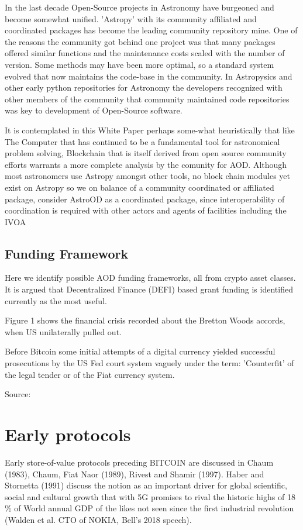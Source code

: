 \documentclass[final,5p,times,twocolumn,authoryear]{elsarticle}
\begin{document}
In the last decade Open-Source projects in Astronomy have burgeoned and become somewhat unified. 'Astropy' with its community affiliated and coordinated packages has become the leading community repository mine.  One of the reasons the community got behind one project was that many packages offered similar functions and the maintenance costs scaled with the number of version. Some methods may have been more optimal, so a standard system evolved that now maintains the code-base in the community. In Astropysics and other early python repositories for Astronomy the developers recognized with other members of the community that community maintained code repositories was key to development of Open-Source software.

It is contemplated in this White Paper perhaps some-what heuristically that like The Computer that has continued to be a fundamental tool for astronomical problem solving, Blockchain that is itself derived from open source community efforts warrants a more complete analysis by the comunity for AOD. Although most astronomers use Astropy amongst other tools, no block chain modules yet exist on Astropy so we on balance of a community coordinated or affiliated package, consider AstroOD as a coordinated package, since interoperability of coordination is required with other actors and agents of facilities including the IVOA 

\subsection{Funding Framework}

Here we identify possible AOD funding frameworks, all from crypto asset classes.  It is argued that Decentralized Finance (DEFI) based grant funding is identified currently as the most useful.

Figure 1 shows the financial crisis recorded about the Bretton Woods accords, when US unilaterally pulled out.

Before Bitcoin some initial attempts of a digital currency yielded successful prosecutions by the US Fed court system vaguely under the term: 'Counterfit' of the legal tender or of the Fiat currency system. 

Source:  
 
\section{Early protocols}
\label{sec:btc3}

Early store-of-value protocols preceding BITCOIN are discussed in Chaum (1983), Chaum, Fiat Naor (1989), Rivest and Shamir (1997). Haber and Stornetta (1991) discuss the notion as an important driver for global scientific, social and cultural growth that with 5G promises to rival the historic highs of 18 \% of World annual GDP of the likes not seen since the first industrial revolution (Walden et al. CTO of NOKIA, Bell's 2018 speech).
\end{document}
